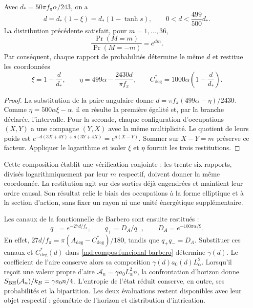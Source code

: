 \begin{proposition}
\label{ins29:vii:curva}
Avec \(d_*=50\pi f_\pi\alpha/243\), on a
\[
 d=d_*(1-\xi)=d_*(1-\tanh s),\qquad
 0<d<\frac{499}{500}d_*.
\]
La distribution précédente satisfait, pour \(m=1,\ldots,36\),
\[
 \frac{\Pr(M=m)}{\Pr(M=-m)}=e^{dm}.
\]
Par conséquent, chaque rapport de probabilités détermine le même \(d\)
et restitue les coordonnées
\[
 \xi=1-\frac d{d_*},\qquad
 \eta=499\alpha-\frac{2430d}{\pi f_\pi},\qquad
 C^*_{\deg}=1000\alpha\left(1-\frac d{d_*}\right).
\]
\end{proposition}
\begin{proof}
La substitution de la paire angulaire donne
\(d=\pi f_\pi(499\alpha-\eta)/2430\).
Comme \(\eta=500\alpha\xi-\alpha\), il en résulte la première égalité et,
par la branche déclarée, l’intervalle. Pour la seconde, chaque configuration
d’occupations \((X,Y)\) a une compagne \((Y,X)\) avec la même
multiplicité. Le quotient de leurs poids est
\(e^{-d(3X+4Y)+d(3Y+4X)}=e^{d(X-Y)}\).
Sommer sur \(X-Y=m\) préserve ce facteur. Appliquer le logarithme et
isoler \(\xi\) et \(\eta\) fournit les trois restitutions.
\end{proof}

Cette composition établit une vérification conjointe : les trente-six
rapports, divisés logarithmiquement par leur \(m\) respectif, doivent donner
la même coordonnée. La restitution agit sur des sorties déjà engendrées et
maintient leur ordre causal. Son résultat relie le biais des occupations
à la forme elliptique et à la section d’action, sans fixer un rayon ni une
unité énergétique supplémentaire.

Les canaux de la fonctionnelle de Barbero sont ensuite restitués :
\[
 q_-=e^{-27d/f_\pi},\qquad
 q_+=D_A/q_-,\qquad D_A=e^{-100\pi\alpha/9}.
\]
En effet, \(27d/f_\pi=\pi(A_{\deg}-C^*_{\deg})/180\), tandis que
\(q_+q_-=D_A\). Substituer ces canaux et \(C^*_{\deg}(d)\) dans
\eqref{md:compos:funcional-barbero} détermine \(\gamma(d)\).
Le coefficient de l’aire conserve alors sa composition
\(\gamma(d)a_0(d)L_\alpha^2\). Lorsqu’il reçoit une valeur propre d’aire
\(\mathcal A_n=\gamma a_0L_\alpha^2n\), la confrontation d’horizon
donne \(S_{\rm BH}(\mathcal A_n)/k_B=\gamma a_0n/4\).
L’entropie de l’état réduit conserve, en outre, ses probabilités et
la bipartition. Les deux évaluations restent disponibles avec leur objet
respectif : géométrie de l’horizon et distribution d’intrication.
